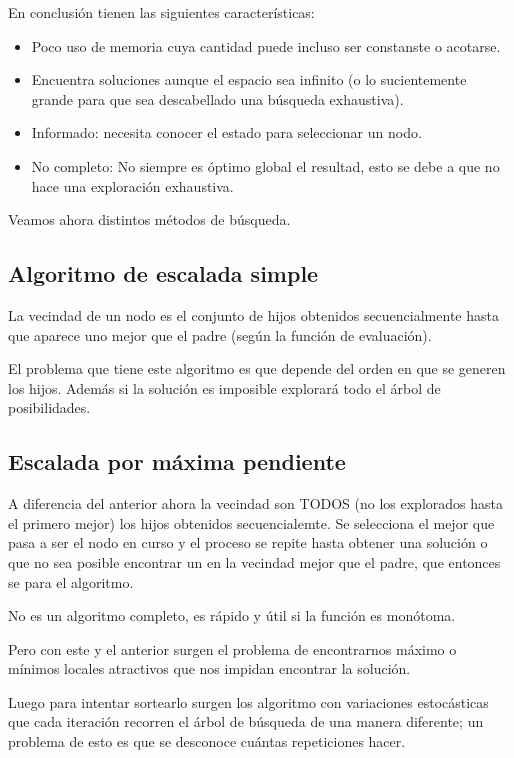 \documentclass[12 pt, a4paper]{article}
\begin{document}
En conclusión tienen las siguientes características: 

\begin{itemize}
  \item Poco uso de memoria cuya cantidad puede incluso ser constanste o acotarse. 
  \item Encuentra soluciones aunque el espacio sea infinito (o lo sucientemente grande para que sea descabellado una búsqueda exhaustiva).
  \item Informado: necesita conocer el estado para seleccionar un nodo. 
  \item No completo: No siempre es óptimo global el resultad, esto se debe a que no hace una exploración exhaustiva.
\end{itemize}

Veamos ahora distintos métodos de búsqueda. 

\subsection{Algoritmo de escalada simple}
La vecindad de un nodo es el conjunto de hijos obtenidos secuencialmente
hasta que aparece uno mejor que el padre (según la función de evaluación). 

El problema que tiene este algoritmo es que depende del orden en que se generen los hijos. 
 Además si la solución es imposible explorará todo el árbol de posibilidades. 


 \subsection{Escalada por máxima pendiente}
  A diferencia del anterior ahora la vecindad son TODOS (no los explorados hasta el primero mejor) los hijos obtenidos secuencialemte.
  Se selecciona el mejor que pasa a ser el nodo en curso y el proceso se repite hasta obtener una solución o que no sea posible
  encontrar un en la vecindad mejor que el padre, que entonces se para el algoritmo.

  No es un algoritmo completo, es rápido y útil si la función es monótoma. 

  Pero con este y el anterior surgen el problema de encontrarnos máximo o mínimos locales 
  atractivos que nos impidan encontrar la solución. 





  Luego para intentar sortearlo surgen los algoritmo con variaciones estocásticas que cada iteración
  recorren el árbol de búsqueda de una manera diferente; un problema de esto es que se desconoce cuántas 
  repeticiones hacer.  
\end{document}

